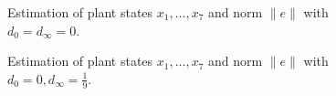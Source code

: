 \documentclass[11pt,letterpaper,twoside,openright]{report}
\providecommand{\norm}[1]{\lVert#1\rVert}
\begin{document}
\begin{figure}[htbp]
	\caption{Estimation of plant states $x_1,...,x_7$ and norm $\norm{e}$ with $d_0=d_{\infty}=0$.}
	\label{fig: CH4 Error states and norm, e_0 linear}
\end{figure}

\begin{figure}[htbp]
	\caption{Estimation of plant states $x_1,...,x_7$ and norm  $\norm{e}$ with $d_0=0,d_{\infty}=\tfrac{1}{9}$.}
	\label{fig: CH4 Error states and norm, e_0 cont}
\end{figure}
\end{document}

